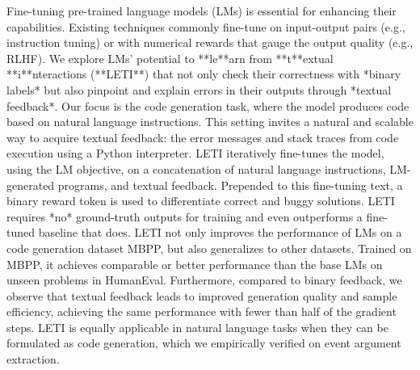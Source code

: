 Fine-tuning pre-trained language models (LMs) is essential for enhancing their capabilities. Existing techniques commonly fine-tune on input-output pairs (e.g., instruction tuning) or with numerical rewards that gauge the output quality (e.g., RLHF). We explore LMs' potential to **le**arn from **t**extual **i**nteractions (**LETI**) that not only check their correctness with *binary labels* but also pinpoint and explain errors in their outputs through *textual feedback*. Our focus is the code generation task, where the model produces code based on natural language instructions.  This setting invites a natural and scalable way to acquire textual feedback: the error messages and stack traces from code execution using a Python interpreter. LETI iteratively fine-tunes the model, using the LM objective, on a concatenation of natural language instructions, LM-generated programs, and textual feedback. Prepended to this fine-tuning text, a binary reward token is used to differentiate correct and buggy solutions. LETI requires *no* ground-truth outputs for training and even outperforms a fine-tuned baseline that does.  LETI not only improves the performance of LMs on a code generation dataset MBPP, but also generalizes to other datasets.  Trained on MBPP, it achieves comparable or better performance than the base LMs on unseen problems in HumanEval.  Furthermore, compared to binary feedback, we observe that textual feedback leads to improved generation quality and sample efficiency, achieving the same performance with fewer than half of the gradient steps. LETI is equally applicable in natural language tasks when they can be formulated as code generation, which we empirically verified on event argument extraction.